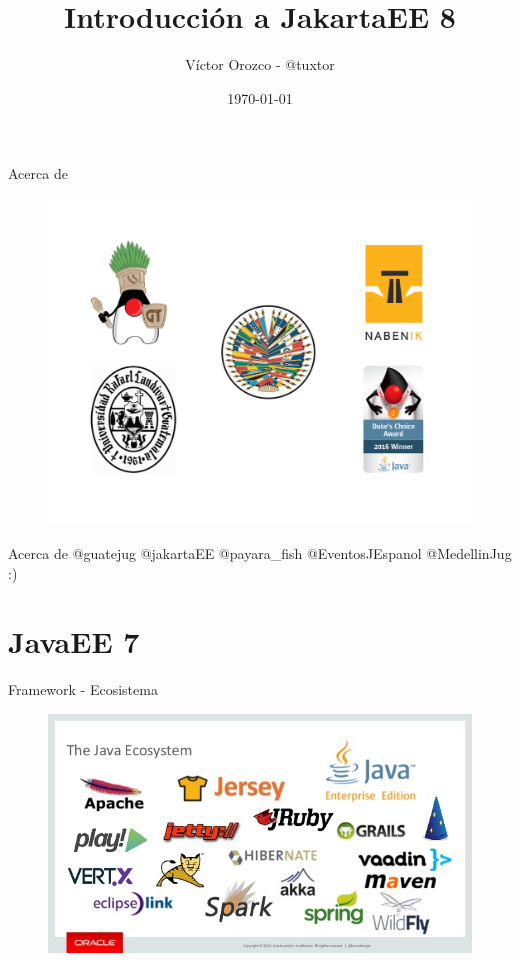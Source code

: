 \documentclass{beamer}
\title{Introducción a JakartaEE 8}
\author{Víctor Orozco - @tuxtor}
\institute{Hackdays comunidad hispana 2018}
\date{\today}
\begin{document}
\frame{\titlepage}

\begin{frame}{Acerca de}
\begin{figure}
	\centering
	\includegraphics[width=\linewidth]{Images/fescudos}
\end{figure}
\end{frame}

\begin{frame}{Acerca de}
\huge @guatejug  @jakartaEE @payara\_fish @EventosJEspanol @MedellinJug :)
\end{frame}



\section{JavaEE 7}
\begin{frame}{Framework - Ecosistema}
	\begin{figure}
		\centering
		\includegraphics[width=0.9\linewidth]{Images/ecosystem}
	\end{figure}
\end{frame}
\end{document}
